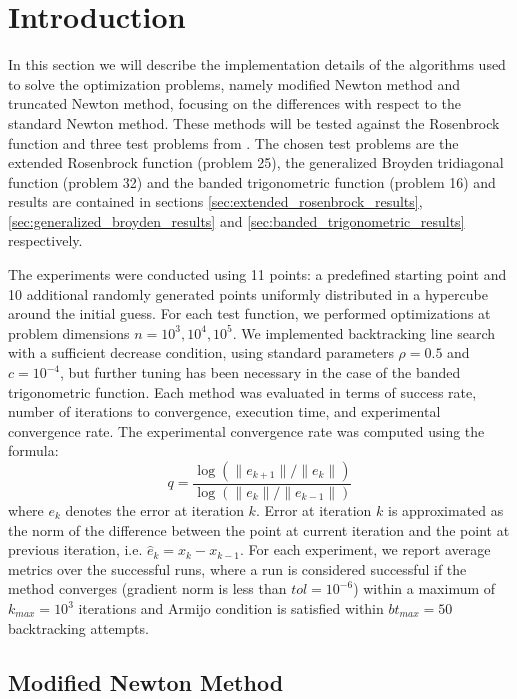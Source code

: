 \section{Introduction}
\label{sec:implementation_details}

In this section we will describe the implementation details of the algorithms used to solve the optimization problems, namely modified Newton method and truncated Newton method, focusing on the differences with respect to the standard Newton method.
These methods will be tested against the Rosenbrock function and three test problems from \cite{test-problems-unconstrained}.
The chosen test problems are the extended Rosenbrock function (problem 25), the generalized Broyden tridiagonal function (problem 32) and the banded trigonometric function (problem 16) and results are contained in sections \ref{sec:extended_rosenbrock_results}, \ref{sec:generalized_broyden_results} and \ref{sec:banded_trigonometric_results} respectively.

The experiments were conducted using 11 points: a predefined starting point and 10 additional randomly generated points uniformly distributed in a hypercube around the initial guess. For each test function, we performed optimizations at problem dimensions $n = 10^3, 10^4, 10^5$. We implemented backtracking line search with a sufficient decrease condition, using standard parameters $\rho = 0.5$ and $c = 10^{-4}$, but further tuning has been necessary in the case of the banded trigonometric function. Each method was evaluated in terms of success rate, number of iterations to convergence, execution time, and experimental convergence rate.
The experimental convergence rate was computed using the formula:
\begin{equation}
    q = \frac{\log(\|e_{k+1}\| / \|e_k\|)}{\log(\|e_k\| / \|e_{k-1}\|)}
\end{equation}
where $e_k$ denotes the error at iteration $k$.
Error at iteration $k$ is approximated as the norm of the difference between the point at current iteration and the point at previous iteration, i.e. $\hat{e}_k = x_k - x_{k-1}$.
For each experiment, we report average metrics over the successful runs, where a run is considered successful if the method converges (gradient norm is less than $\textit{tol} = 10^{-6}$) within a maximum of $k_{\textit{max}} = 10^3$ iterations and Armijo condition is satisfied within $\textit{bt}_{\textit{max}} = 50$ backtracking attempts.

\subsection{Modified Newton Method}

